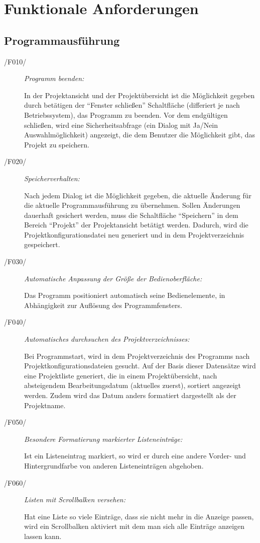 \section{Funktionale Anforderungen}

\subsection{Programmausführung}

\label{subsec:programmausfuehrung}

	\begin{description}
		
		\item[/F010/] \textit{Programm beenden:}\par In der Projektansicht und der Projektübersicht ist die Möglichkeit gegeben durch betätigen der "`Fenster schließen"' Schaltfläche (differiert je nach Betriebssystem), das Programm zu beenden. Vor dem endgültigen schließen, wird eine Sicherheitsabfrage (ein Dialog mit Ja/Nein Auswahlmöglichkeit) angezeigt, die dem Benutzer die Möglichkeit gibt, das Projekt zu speichern.
		
		\item[/F020/] \textit{Speicherverhalten:}\par Nach jedem Dialog ist die Möglichkeit gegeben, die aktuelle Änderung für die aktuelle Programmausführung zu übernehmen. Sollen Änderungen dauerhaft gesichert werden, muss die Schaltfläche "`Speichern"' in dem Bereich "`Projekt"' der Projektansicht betätigt werden. Dadurch, wird die Projektkonfigurationsdatei neu generiert und in dem Projektverzeichnis gespeichert.
		
		\item[/F030/] \textit{Automatische Anpassung der Größe der Bedienoberfläche:}\par Das Programm positioniert automatisch seine Bedienelemente, in Abhängigkeit zur Auflösung des Programmfensters.
		
		\item[/F040/] \textit{Automatisches durchsuchen des Projektverzeichnisses:}\par Bei Programmstart, wird in dem Projektverzeichnis des Programms nach Projektkonfigurationsdateien gesucht. Auf der Basis dieser Datensätze wird eine Projektliste generiert, die in einem Projektübersicht, nach absteigendem Bearbeitungsdatum (aktuelles zuerst), sortiert angezeigt werden. Zudem wird das Datum anders formatiert dargestellt als der Projektname.
		
		\item[/F050/] \textit{Besondere Formatierung markierter Listeneinträge:}\par Ist ein Listeneintrag markiert, so wird er durch eine andere Vorder- und Hintergrundfarbe von anderen Listeneinträgen abgehoben.

		\item[/F060/] \textit{Listen mit Scrollbalken versehen:}\par Hat eine Liste so viele Einträge, dass sie nicht mehr in die Anzeige passen, wird ein Scrollbalken aktiviert mit dem man sich alle Einträge anzeigen lassen kann.
		
	\end{description}

